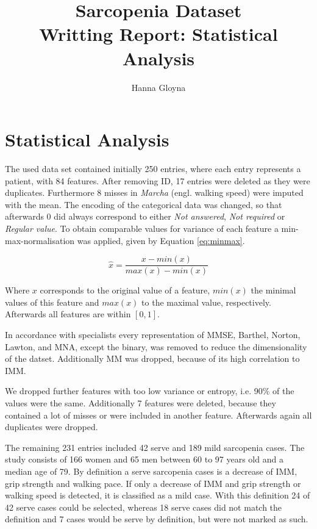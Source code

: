 \documentclass[11pt]{article}
\author{Hanna Gloyna}
\title{Sarcopenia Dataset\\
		\large Writting Report: Statistical Analysis}
\date{}
\begin{document}
\twocolumn
\maketitle
\thispagestyle{fancy}

\section{Statistical Analysis}
The used data set contained initially 250 entries, where each entry represents a patient, with 84 features. After removing ID, 17 entries were deleted as they were duplicates. Furthermore 8 misses in \emph{Marcha} (engl. walking speed) were imputed with the mean. The encoding of the categorical data was changed, so that afterwards $0$ did always correspond to either \emph{Not answered}, \emph{Not required} or \emph{Regular value}. To obtain comparable values for variance of each feature a min-max-normalisation was applied, given by Equation \ref{eq:minmax}.

\begin{equation}\label{eq:minmax}
\hat{x} = \frac{x-min(x)}{max(x)-min(x)}
\end{equation}

Where $x$ corresponds to the original value of a feature, $min(x)$ the minimal values of this feature and $max(x)$ to the maximal value, respectively. Afterwards all features are within $\left[0,1\right]$.

In accordance with specialists every representation of MMSE, Barthel, Norton, Lawton, and MNA, except the binary, was removed to reduce the dimensionality of the datset. Additionally MM was dropped, because of its high correlation to IMM.

We dropped further features with too low variance or entropy, i.e. 90\% of the values were the same. Additionally 7 features were deleted, because they contained a lot of misses or were included in another feature. Afterwards again all duplicates were dropped.

The remaining 231 entries included 42 serve and 189 mild sarcopenia cases. The study consists of 166 women and 65 men between 60 to 97 years old and a median age of 79. By definition a serve sarcopenia cases is a decrease of IMM, grip strength and walking pace. If only a decrease of IMM and grip strength or walking speed is detected, it is classified as a mild case. With this definition 24 of 42 serve cases could be selected, whereas 18 serve cases did not match the definition and 7 cases would be serve by definition, but were not marked as such.
\end{document}
